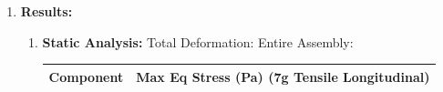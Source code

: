 \documentclass[../../main.tex]{subfiles}
\begin{document}
\begin{enumerate}
\begin{enumerate}
            \newline
            \newline
            \item \textbf{Results:}
            \begin{enumerate}
                \item \textbf{Static Analysis:} Total Deformation: Entire Assembly: 
                \begin{table}[h!]
                    \centering
                    \begin{tabular}{|p{8cm}|p{6cm}|}
                         \hline
                         \textbf{Component} & \textbf{Max Eq Stress (Pa) \newline(7g Tensile Longitudinal)} \\
                         \hline
                        

\end{tabular}
\end{table}
\end{enumerate}
\end{enumerate}
\end{enumerate}
\end{document}
